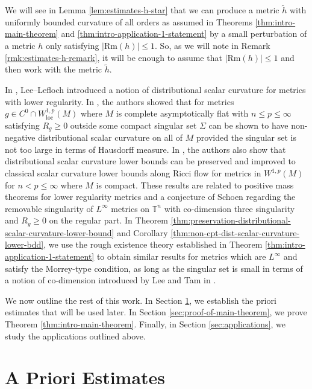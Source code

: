 \documentclass[12pt]{amsart}
\theoremstyle{plain}
\theoremstyle{plain}
\theoremstyle{definition}
\theoremstyle{remark}
\numberwithin{equation}{subsection}
\begin{document}
We will see in Lemma \ref{lem:estimates-h-star} that we can produce a metric $\tilde{h}$ with uniformly bounded curvature of all orders as assumed in Theorems \ref{thm:intro-main-theorem} and \ref{thm:intro-application-1-statement} by a small perturbation of a metric $h$ only satisfying $|\text{Rm}(h)|\leq 1$. So, as we will note in  Remark \ref{rmk:estimates-h-remark}, it will be enough to assume that $|\text{Rm}(h)|\leq 1$ and then work with the metric $\tilde{h}$.

In \cite{lee_positive_2015}, Lee--Lefloch introduced a notion of distributional scalar curvature for metrics with lower regularity. In \cite{jiang_removable_2022}, the authors showed that for metrics $g \in C^0 \cap W^{1,p}_{\text{loc}}(M)$ where $M$ is complete asymptotically flat with $n \leq p \leq \infty$ satisfying $R_g \geq 0$ outside some compact singular set $\Sigma$ can be shown to have non-negative distributional scalar curvature on all of $M$ provided the singular set is not too large in terms of Hausdorff measure. In \cite{jiang_weak_2021}, the authors also show that distributional scalar curvature lower bounds can be preserved and improved to classical scalar curvature lower bounds along Ricci flow for metrics in $W^{1,p}(M)$ for $n < p \leq \infty$ where $M$ is compact. These results are related to positive mass theorems for lower regularity metrics and a conjecture of Schoen regarding the removable singularity of $L^\infty$ metrics on $\mathbb{T}^n$ with co-dimension three singularity and $R_g \geq 0$ on the regular part. In Theorem \ref{thm:preservation-distributional-scalar-curvature-lower-bound} and Corollary \ref{thm:non-cpt-dist-scalar-curvature-lower-bdd}, we use the rough existence theory established in Theorem \ref{thm:intro-application-1-statement} to obtain similar results for metrics which are $L^\infty$ and satisfy the Morrey-type condition, as long as the singular set is small in terms of a notion of co-dimension introduced by Lee and Tam in \cite{lee_continuous_2021}.

We now outline the rest of this work. In Section \ref{sec:a-priori-estimates}, we establish the priori estimates that will be used later. In Section \ref{sec:proof-of-main-theorem}, we prove Theorem \ref{thm:intro-main-theorem}. Finally, in Section \ref{sec:applications}, we study the applications outlined above.

\section{A Priori Estimates}\label{sec:a-priori-estimates}
\end{document}
